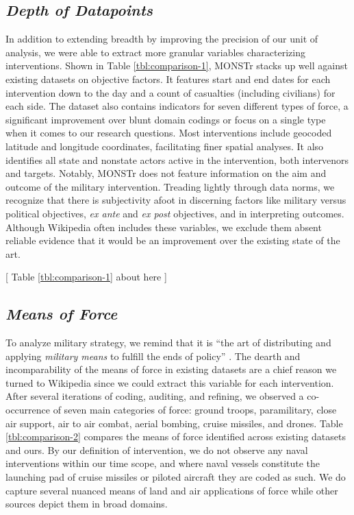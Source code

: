 \documentclass[fleqn,12pt]{article}
\begin{document}
\subsection*{\textit{Depth of Datapoints}}
In addition to extending breadth by improving the precision of our unit of analysis, we were able to extract more granular variables characterizing interventions. Shown in Table \ref{tbl:comparison-1}, MONSTr stacks up well against existing datasets on objective factors. It features start and end dates for each intervention down to the day and a count of casualties (including civilians) for each side. The dataset also contains indicators for seven different types of force, a significant improvement over blunt domain codings or focus on a single type when it comes to our research questions. Most interventions include geocoded latitude and longitude coordinates, facilitating finer spatial analyses. It also identifies all state and nonstate actors active in the intervention, both intervenors and targets. Notably, MONSTr does not feature information on the aim and outcome of the military intervention. Treading lightly through data norms, we recognize that there is subjectivity afoot in discerning factors like military versus political objectives, \textit{ex ante} and \textit{ex post} objectives, and in interpreting outcomes. Although Wikipedia often includes these variables, we exclude them absent reliable evidence that it would be an improvement over the existing state of the art.

\begin{center}
	[ Table \ref{tbl:comparison-1} about here ]
\end{center}

\subsection*{\textit{Means of Force}}
To analyze military strategy, we remind that it is ``the art of distributing and applying \textit{military means} to fulfill the ends of policy” \citep[][335]{hart_strategyindirectapproach_1967}. The dearth and incomparability of the means of force in existing datasets are a chief reason we turned to Wikipedia since we could extract this variable for each intervention. After several iterations of coding, auditing, and refining, we observed a co-occurrence of seven main categories of force: ground troops, paramilitary, close air support, air to air combat, aerial bombing, cruise missiles, and drones. Table \ref{tbl:comparison-2} compares the means of force identified across existing datasets and ours. By our definition of intervention, we do not observe any naval interventions within our time scope, and where naval vessels constitute the launching pad of cruise missiles or piloted aircraft they are coded as such. We do capture several nuanced means of land and air applications of force while other sources depict them in broad domains.
\end{document}
